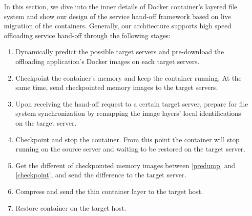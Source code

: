 
In this section, we dive into the inner details of Docker container's layered file system and show our design of the  service hand-off framework based on live migration of the containers.  Generally, our architecture supports high speed offloading service hand-off through the following stages:

\begin{enumerate}[label=\textbf{S\arabic*}]

\item Dynamically predict the possible target servers and pre-download the offloading application's Docker images on each target servers.

\item \label{predump} Checkpoint the container's memory and keep the container running. At the same time, send checkpointed memory images to the target servers. 

\item \label{prepare} Upon receiving the hand-off request to a certain target server, prepare for file system synchronization by remapping the image layers' local identifications on the target server.


\item \label{checkpoint} Checkpoint and stop the container. From this point the container will stop running on the source server and waiting to be restored on the target server.

\item \label{img-sync} Get the different of checkpointed memory images between \ref{predump} and \ref{checkpoint}, and send the difference to the target server. 

\item \label{fs-sync} Compress and send the thin container layer to the target host.

\item \label{restore} Restore container on the target host.

\end{enumerate}



